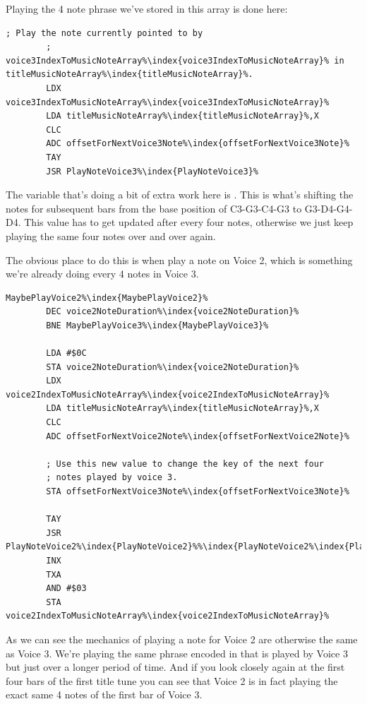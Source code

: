 Playing the 4 note phrase we've stored in this array is done here:

\begin{lstlisting}[escapechar=\%]
        ; Play the note currently pointed to by 
        ; voice3IndexToMusicNoteArray%\index{voice3IndexToMusicNoteArray}% in titleMusicNoteArray%\index{titleMusicNoteArray}%.
        LDX voice3IndexToMusicNoteArray%\index{voice3IndexToMusicNoteArray}%
        LDA titleMusicNoteArray%\index{titleMusicNoteArray}%,X
        CLC
        ADC offsetForNextVoice3Note%\index{offsetForNextVoice3Note}%
        TAY
        JSR PlayNoteVoice3%\index{PlayNoteVoice3}%

\end{lstlisting}

The variable that's doing a bit of extra work here is . This is what's shifting the
notes for subsequent bars from the base position of C3-G3-C4-G3 to G3-D4-G4-D4. This value has to get updated after
every four notes, otherwise we just keep playing the same four notes over and over again.

The obvious place to do this is when play a note on Voice 2, which is something we're already doing every 4 notes
in Voice 3.

\begin{lstlisting}[escapechar=\%]
MaybePlayVoice2%\index{MaybePlayVoice2}%   
        DEC voice2NoteDuration%\index{voice2NoteDuration}%
        BNE MaybePlayVoice3%\index{MaybePlayVoice3}%

        LDA #$0C
        STA voice2NoteDuration%\index{voice2NoteDuration}%
        LDX voice2IndexToMusicNoteArray%\index{voice2IndexToMusicNoteArray}%
        LDA titleMusicNoteArray%\index{titleMusicNoteArray}%,X
        CLC
        ADC offsetForNextVoice2Note%\index{offsetForNextVoice2Note}%

        ; Use this new value to change the key of the next four
        ; notes played by voice 3. 
        STA offsetForNextVoice3Note%\index{offsetForNextVoice3Note}%

        TAY
        JSR PlayNoteVoice2%\index{PlayNoteVoice2}%%\index{PlayNoteVoice2%\index{PlayNoteVoice2}%}%
        INX
        TXA
        AND #$03
        STA voice2IndexToMusicNoteArray%\index{voice2IndexToMusicNoteArray}%
\end{lstlisting}

As we can see the mechanics of playing a note for Voice 2 are otherwise the same as Voice 3. We're playing the
same phrase encoded in  that is played by Voice 3 but just over a longer period of
time. And if you look closely again at the first four bars of the first title tune you can see that Voice 2
is in fact playing the exact same 4 notes of the first bar of Voice 3.

